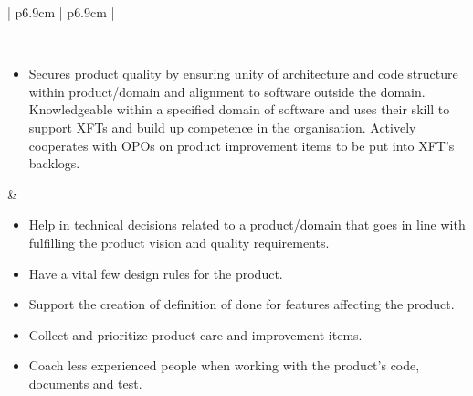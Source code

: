 \begin{table}[h]
\begin{tabularx}{\textwidth}{ | p{6.9cm} | p{6.9cm} | }
   \\ \hline
      
   
   \\ \hline
   
   \begin{itemize}[label={}, leftmargin=*, topsep=0pt, itemsep=0pt, partopsep=0pt]
     \item Secures product quality by ensuring unity of architecture and code structure within product/domain and alignment to software outside the domain. Knowledgeable within a specified domain of software and uses their skill to support \acp{XFT} and build up competence in the organisation. Actively cooperates with \acp{OPO} on product improvement items to be put into \ac{XFT}'s backlogs.
   \end{itemize} & 
   
   \begin{itemize}[label={}, leftmargin=*, topsep=0pt, itemsep=0pt, partopsep=0pt]
     \item Help in technical decisions related to a product/domain that goes in line with fulfilling the product vision and quality requirements.
     \item Have a vital few design rules for the product.
     \item Support the creation of definition of done for features affecting the product.
     \item Collect and prioritize product care and improvement items.
     \item Coach less experienced people when working with the product's code, documents and test.
   \end{itemize} 
   
   \\ \hline
   
   \end{tabularx}
\end{table}

